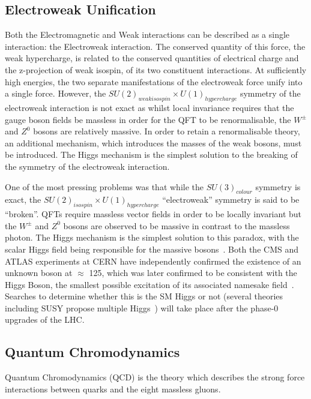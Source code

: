 \subsection{Electroweak Unification}\label{subsec:electroweak}
Both the Electromagnetic and Weak interactions can be described as a single interaction: the Electroweak interaction. 
The conserved quantity of this force, the weak hypercharge, is related to the conserved quantities of electrical charge and the z-projection of weak isospin, of its two constituent interactions. 
At sufficiently high energies, the two separate manifestations of the electroweak force unify into a single force. 
However, the $SU(2)_{weak isospin} \times U(1)_{hypercharge}$ symmetry of the electroweak interaction is not exact as whilst local invariance requires that the gauge boson fields be massless in order for the QFT to be renormalisable, the $W^{\pm}$ and $Z^{0}$ bosons are relatively massive. 
In order to retain a renormalisable theory, an additional mechanism, which introduces the masses of the weak bosons, must be introduced. 
The Higgs mechanism is the simplest solution to the breaking of the symmetry of the electroweak interaction\cite{LagrangiansSM}. 

One of the most pressing problems was that while the $SU(3)_{colour}$ symmetry is exact, the $SU(2)_{isospin} \times U(1)_{hypercharge}$ ``electroweak'' symmetry is said to be ``broken''. 
QFTs require massless vector fields in order to be locally invariant but the $W^{\pm}$ and $Z^{0}$ bosons are observed to be massive in contrast to the massless photon. 
The Higgs mechanism is the simplest solution to this paradox, with the scalar Higgs field being responsible for the massive bosons~\cite{oldcms}. 
Both the CMS and ATLAS experiments at CERN have independently confirmed the existence of an unknown boson at $\approx$ 125\GeV, which was later confirmed to be consistent with the Higgs Boson, the smallest possible excitation of its associated namesake field~\cite{HiggsCMS,HiggsATLAS}. 
Searches to determine whether this is the SM Higgs or not (several theories including SUSY propose multiple Higgs~\cite{Khalil:2003vd,Gianotti:2002xx}) will take place after the phase-0 upgrades of the LHC. 


\subsection{Quantum Chromodynamics}\label{subsec:QED}
Quantum Chromodynamics (QCD) is the theory which describes the strong force interactions between quarks and the eight massless gluons.

